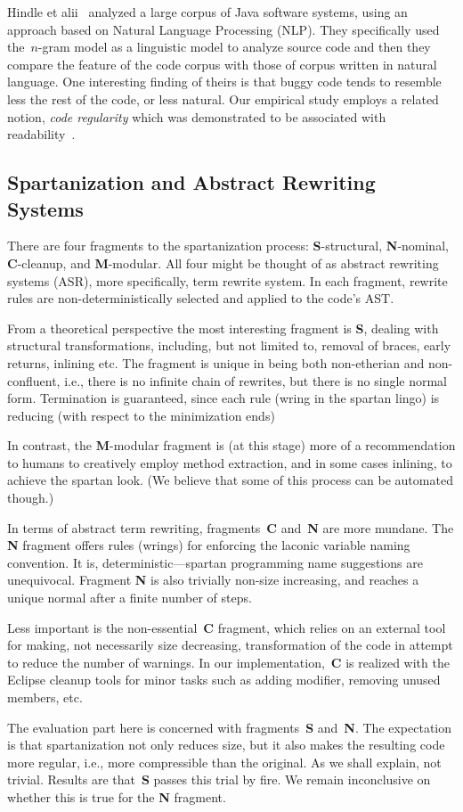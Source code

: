 Hindle et alii~\cite{Hindle:Bar:Su:Gabel:Devanbu:12} analyzed a large corpus of
Java software systems, using an approach based on Natural Language Processing
(NLP). They specifically used the~$n$-gram model as a linguistic model to
analyze source code and then they compare the feature of the code corpus with
those of corpus written in natural language. One interesting finding of theirs
is that buggy code tends to resemble less the rest of the code, or less
natural. Our empirical study employs a related notion, \emph{code regularity}
which was demonstrated to be associated with
readability~\cite{Jbara:Feitelson:14}.

\subsection{Spartanization and Abstract Rewriting Systems}

There are four fragments to the spartanization process: \textbf{S}-structural,
\textbf{N}-nominal, \textbf{C}-cleanup, and \textbf{M}-modular. All four might
be thought of as abstract rewriting systems (ASR), more specifically, term
rewrite system. In each fragment, rewrite rules are non-deterministically
selected and applied to the code's AST.

From a theoretical perspective the most interesting fragment is \textbf{S},
dealing with structural transformations, including, but not limited to, removal
of braces, early returns, inlining etc. The fragment is unique in being both
non-etherian and non-confluent, i.e., there is no infinite chain of rewrites,
but there is no single normal form. Termination is guaranteed, since each rule
(wring in the spartan lingo) is reducing (with respect to the minimization
ends)

In contrast, the \textbf{M}-modular fragment is (at this stage) more of a
recommendation to humans to creatively employ method extraction, and in some
cases inlining, to achieve the spartan look. (We believe that some of this
process can be automated though.)

In terms of abstract term rewriting, fragments~\textbf{C} and~\textbf{N} are
more mundane. The \textbf{N} fragment offers rules (wrings) for enforcing the
laconic variable naming convention. It is, deterministic---spartan programming
name suggestions are unequivocal. Fragment \textbf{N} is also trivially
non-size increasing, and reaches a unique normal after a finite number of
steps.

Less important is the non-essential~\textbf{C} fragment, which relies on an
external tool for making, not necessarily size decreasing, transformation of
the code in attempt to reduce the number of warnings. In our
implementation,~\textbf{C} is realized with the Eclipse cleanup tools for minor
tasks such as adding  modifier, removing unused members, etc.

The evaluation part here is concerned with fragments~\textbf{S}
and~\textbf{N}. The expectation is that spartanization not only reduces size,
but it also makes the resulting code more regular, i.e., more compressible than
the original. As we shall explain, not trivial. Results are that~\textbf{S}
passes this trial by fire. We remain inconclusive on whether this is true for
the \textbf{N} fragment.
